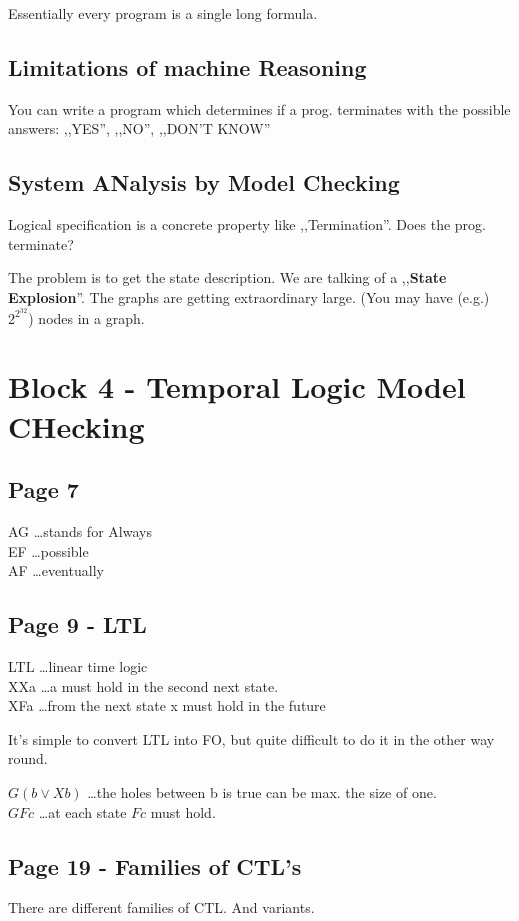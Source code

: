 \documentclass[a4paper]{article}
\begin{document}
Essentially every program is a single long formula.

\subsection{Limitations of machine Reasoning}

You can write a program which determines if a prog. terminates with the possible
answers: ,,YES'', ,,NO'', ,,DON'T KNOW''

\subsection{System ANalysis by Model Checking}
Logical specification is a concrete property like ,,Termination''. Does the
prog. terminate?

The problem is to get the state description. We are talking of a
,,\textbf{State Explosion}''. The graphs are getting extraordinary large. (You
may have (e.g.) $2^{2^{32}}$) nodes in a graph.


\section{Block 4 - Temporal Logic Model CHecking}

\subsection{Page 7}
AG \ldots stands for Always\\
EF \ldots possible\\
AF \ldots eventually

\subsection{Page 9 - LTL}
LTL \ldots linear time logic\\
XXa \ldots a must hold in the second next state.\\
XFa \ldots from the next state x must hold in the future


It's simple to convert LTL into FO, but quite difficult to do it in the other
way round.

$G(b \vee Xb)$ \ldots the holes between b is true can be max. the size of one.\\
$GFc$ \ldots at each state $Fc$ must hold.


\subsection{Page 19 - Families of CTL's}
There are different families of CTL. And variants.
\end{document}
